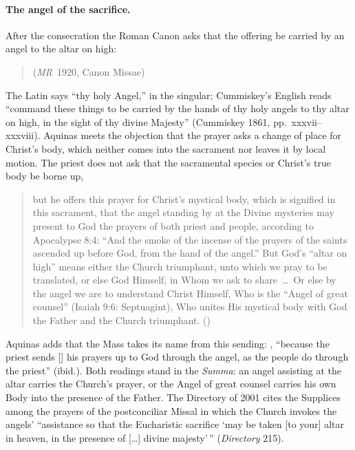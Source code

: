 \paragraph{The angel of the sacrifice.} After the consecration the Roman
Canon asks that the offering be carried by an angel to the altar on high:
\begin{quote}
 (\emph{MR}~1920, Canon Missae)
\end{quote}
The Latin says ``thy holy Angel,'' in the singular; Cummiskey's English
reads ``command these things to be carried by the hands of thy holy
angels to thy altar on high, in the sight of thy divine Majesty''
(Cummiskey 1861, pp.~xxxvii--xxxviii). Aquinas meets the objection that
the prayer asks a change of place for Christ's body, which neither comes
into the sacrament nor leaves it by local motion. The priest does not ask
that the sacramental species or Christ's true body be borne up,
\begin{quote}
but he offers this prayer for Christ's mystical body, which is signified
in this sacrament, that the angel standing by at the Divine mysteries may
present to God the prayers of both priest and people, according to
Apocalypse 8:4: ``And the smoke of the incense of the prayers of the
saints ascended up before God, from the hand of the angel.'' But God's
``altar on high'' means either the Church triumphant, unto which we pray
to be translated, or else God Himself, in Whom we ask to share~\dots\ Or
else by the angel we are to understand Christ Himself, Who is the ``Angel
of great counsel'' (Isaiah 9:6: Septuagint), Who unites His mystical body
with God the Father and the Church triumphant. ()
\end{quote}
Aquinas adds that the Mass takes its name from this sending: ,
``because the priest sends [] his prayers up to God through
the angel, as the people do through the priest'' (ibid.). Both readings
stand in the \emph{Summa}: an angel assisting at the altar carries the
Church's prayer, or the Angel of great counsel carries his own Body into
the presence of the Father. The Directory of 2001 cites the Supplices
among the prayers of the postconciliar Missal in which the Church invokes
the angels' ``assistance so that the Eucharistic sacrifice `may be taken
[to your] altar in heaven, in the presence of [\dots] divine majesty'\,''
(\emph{Directory} 215).

